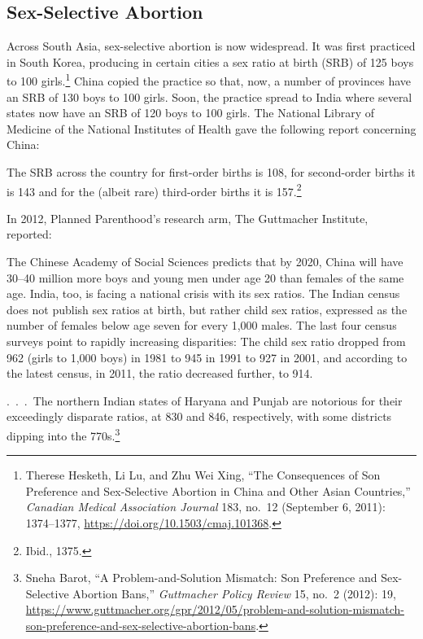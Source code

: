 \documentclass[
]{book}
\begin{document}
\hypertarget{sex-selective-abortion}{%
\subsection{Sex-Selective Abortion}\label{sex-selective-abortion}}

Across South Asia, sex-selective abortion is now widespread. It was first practiced in South Korea, producing in certain cities a sex ratio at birth (SRB) of 125 boys to 100 girls.\footnote{Therese Hesketh, Li Lu, and Zhu Wei Xing, ``The Consequences of Son Preference and Sex-Selective Abortion in China and Other Asian Countries,'' \emph{Canadian Medical Association Journal} 183, no.~12 (September 6, 2011): 1374--1377, \url{https://doi.org/10.1503/cmaj.101368}.} China copied the practice so that, now, a number of provinces have an SRB of 130 boys to 100 girls. Soon, the practice spread to India where several states now have an SRB of 120 boys to 100 girls. The National Library of Medicine of the National Institutes of Health gave the following report concerning China:

The SRB across the country for first-order births is 108, for second-order births it is 143 and for the (albeit rare) third-order births it is 157.\footnote{Ibid., 1375.}

In 2012, Planned Parenthood's research arm, The Guttmacher Institute, reported:

The Chinese Academy of Social Sciences predicts that by 2020, China will have 30--40 million more boys and young men under age 20 than females of the same age. India, too, is facing a national crisis with its sex ratios. The Indian census does not publish sex ratios at birth, but rather child sex ratios, expressed as the number of females below age seven for every 1,000 males. The last four census surveys point to rapidly increasing disparities: The child sex ratio dropped from 962 (girls to 1,000 boys) in 1981 to 945 in 1991 to 927 in 2001, and according to the latest census, in 2011, the ratio decreased further, to 914.

.~.~.~The northern Indian states of Haryana and Punjab are notorious for their exceedingly disparate ratios, at 830 and 846, respectively, with some districts dipping into the 770s.\footnote{Sneha Barot, ``A Problem-and-Solution Mismatch: Son Preference and Sex-Selective Abortion Bans,'' \emph{Guttmacher Policy Review} 15, no.~2 (2012): 19, \url{https://www.guttmacher.org/gpr/2012/05/problem-and-solution-mismatch-son-preference-and-sex-selective-abortion-bans}.}
\end{document}
